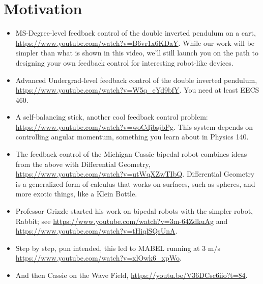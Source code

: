 \newpage


\section{Motivation}
\begin{itemize}
    \item MS-Degree-level feedback control of the double inverted pendulum on a cart,  \url{https://www.youtube.com/watch?v=B6vr1x6KDaY}. While our work will be simpler than what is shown in this video, we'll still launch you on the path to designing your own feedback control for interesting robot-like devices.
    \item Advanced Undergrad-level feedback control of the double inverted pendulum, \url{https://www.youtube.com/watch?v=W5q_eYd9bfY}. You need at least EECS 460.
    \item A self-balancing stick, another cool feedback control problem: \url{https://www.youtube.com/watch?v=woCdjbsjbPg}. This system depends on controlling angular momentum, something you learn about in Physics 140. 
    \item The feedback control of the Michigan Cassie bipedal robot combines ideas from the above with Differential Geometry, \url{https://www.youtube.com/watch?v=utWqXZwTIbQ}. Differential Geometry is a generalized form of calculus that works on surfaces, such as spheres, and more exotic things, like a Klein Bottle. 
    \item Professor Grizzle started his work on bipedal robots with the simpler robot, Rabbit; see \url{https://www.youtube.com/watch?v=3m-64ZdkuAg} and \url{https://www.youtube.com/watch?v=tHiqlSQsUnA}.
    \item Step by step, pun intended, this led to MABEL running at 3 m/s \url{https://www.youtube.com/watch?v=xlOwk6_xpWo}.
    \item And then Cassie on the Wave Field, \url{https://youtu.be/V36DCsc6iio?t=84}.
    
\end{itemize}


